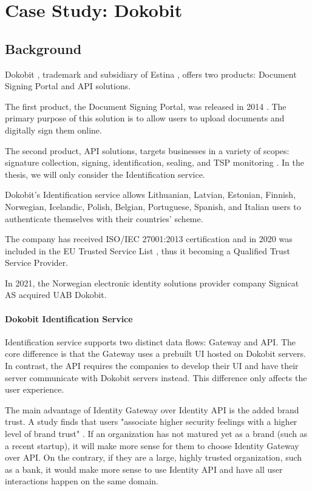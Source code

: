 \section{Case Study: Dokobit}

\subsection{Background}

Dokobit \cite{dokobit}, trademark and subsidiary of Estina \cite{euipo-dokobit}, offers two products: Document Signing Portal and API solutions.

The first product, the Document Signing Portal, was released in 2014 \cite{dokobit-aboutus}. The primary purpose of this solution is to allow users to upload documents and digitally sign them online.

The second product, API solutions, targets businesses in a variety of scopes: signature collection, signing, identification, sealing, and TSP monitoring \cite{dokobit}. In the thesis, we will only consider the Identification service.

Dokobit's Identification service allows Lithuanian, Latvian, Estonian, Finnish, Norwegian, Icelandic, Polish, Belgian, Portuguese, Spanish, and Italian \cite{dokobit} users to authenticate themselves with their countries' scheme.

The company has received ISO/IEC 27001:2013 certification \cite{dokobit-certification} and in 2020 was included in the EU Trusted Service List \cite{eu-trustservices, dokobit-aboutus}, thus it becoming a Qualified Trust Service Provider.

In 2021, the Norwegian electronic identity solutions provider company Signicat AS acquired UAB Dokobit.

\paragraph{Dokobit Identification Service}

Identification service supports two distinct data flows: Gateway and API. The core difference is that the Gateway uses a prebuilt UI hosted on Dokobit servers. In contrast, the API requires the companies to develop their UI and have their server communicate with Dokobit servers instead. This difference only affects the user experience.

The main advantage of Identity Gateway over Identity API is the added brand trust. A study finds that users "associate higher security feelings with a higher level of brand trust" \cite{ha2004factors}. If an organization has not matured yet as a brand (such as a recent startup), it will make more sense for them to choose Identity Gateway over API. On the contrary, if they are a large, highly trusted organization, such as a bank, it would make more sense to use Identity API and have all user interactions happen on the same domain.

